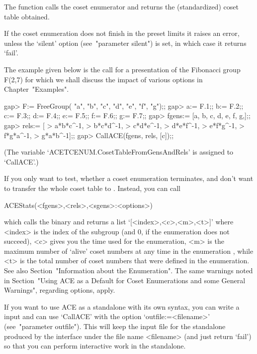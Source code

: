The  function   calls the  {\ACE}  coset  enumerator  and returns  the
(standardized) coset table obtained.

If the coset enumeration does not finish in the preset limits it raises
an error, unless the  `silent' option (see~"parameter silent") is set,
in which case it  returns  `fail'.  

The  example  given  below is  the  call  for  a presentation  of  the
Fibonacci  group F(2,7)  for  which  we shall  discuss  the impact  of
various options in Chapter~"Examples".

\begintt
gap> F:= FreeGroup( "a", "b", "c", "d", "e", "f", "g");;
gap> a:= F.1;; b:= F.2;; c:= F.3;; d:= F.4;; e:= F.5;; f:= F.6;; g:= F.7;;
gap> fgens:= [a, b, c, d, e, f, g,];;
gap> rels:= [
> a*b*c^-1,
> b*c*d^-1,
> c*d*e^-1,
> d*e*f^-1,
> e*f*g^-1,
> f*g*a^-1,
> g*a*b^-1];;
gap> CallACE(fgens, rels, [c]);;
\endtt

(The  variable  `ACETCENUM.CosetTableFromGensAndRels'  is assigned  to
`CallACE'.)

If you only want to  test, whether a coset enumeration terminates, and
don't want to  transfer the whole coset table  to {\GAP}. Instead, you
can call

\>ACEStats(<fgens>,<rels>,<sgens>:<options>)

which    calls    the   {\ACE}    binary    and    returns   a    list
`[<index>,<c>,<m>,<t>]'  where <index>  is the  index of  the subgroup
(and $0$, if the enumeration does not succeed), <c> gives you the time
used for the enumeration, <m> is the maximum number of \lq alive' coset
numbers at any time in the enumeration , while <t> is the total number
of  coset numbers  that  were  defined in  the  enumeration. See  also
Section~"Information about the Enumeration".   The same warnings noted
in     Section~"Using ACE as a Default for Coset Enumerations and some 
General Warnings", regarding options, apply.


If you want  to use ACE as  a standalone with its own  syntax, you can
write  a  {\GAP}   input  and  can  use  `CallACE'   with  the  option
`outfile:=<filename>' (see~"parameter  outfile").  This will  keep the
input file for the {\ACE}  standalone produced by the {\GAP} interface
under the  file name <filename> (and  just return `fail')  so that you
can perform  interactive work in the standalone.

